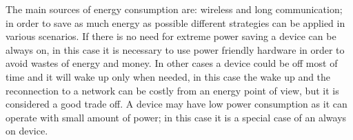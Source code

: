 	The main sources of energy consumption are: wireless and long communication; in order to save as much energy as possible different strategies can be applied in various scenarios.\newline
	If there is no need for extreme power saving a device can be always on, in this case it is necessary to use power friendly hardware in order to avoid wastes of energy and money.\newline
	In other cases a device could be off most of time and it will wake up only when needed, in this case the wake up and the reconnection to a network can be costly from an energy point of view, but it is considered a good trade off.\newline
	A device may have low power consumption as it can operate with small amount of power; in this case it is a special case of an always on device.